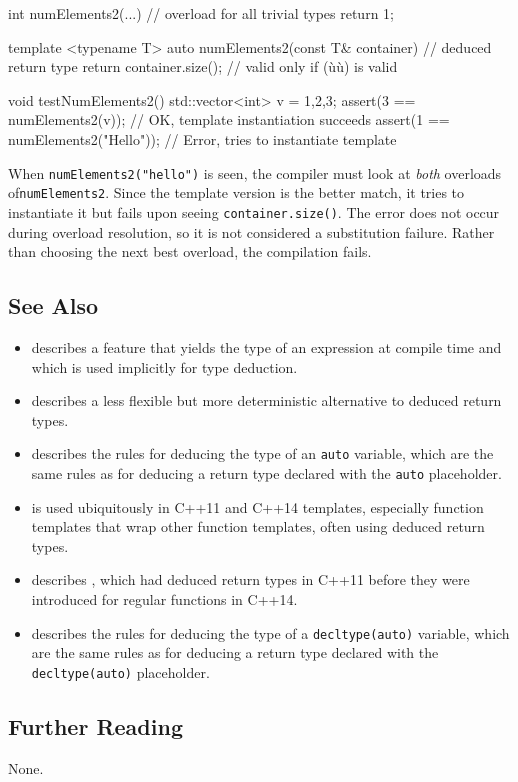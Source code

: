 \begin{emcppslisting}
int numElements2(...)  // overload for all trivial types
{
    return 1;
}

template <typename T>
auto numElements2(const T& container)  // deduced return type
{
    return container.size();  // valid only if (ù{}ù) is valid
}

void testNumElements2()
{
    std::vector<int> v = {1,2,3};
    assert(3 == numElements2(v));        // OK, template instantiation succeeds
    assert(1 == numElements2("Hello"));  // Error, tries to instantiate template
}
\end{emcppslisting}
    

\noindent When \lstinline!numElements2("hello")! is seen, the compiler must look at
\emph{both} overloads of\linebreak[4] \lstinline!numElements2!. Since the template
version is the better match, it tries to instantiate it but fails upon
seeing \lstinline!container.size()!. The error does not occur during
overload resolution, so it is not considered a substitution failure.
Rather than choosing the next best overload, the compilation fails.

\subsection[See Also]{See Also}\label{see-also}

\begin{itemize}
\item{describes a feature that yields the type of an expression at compile time and which is used implicitly for type deduction.}
%
\item{describes a less flexible but more deterministic alternative to deduced return types.}
%
\item{describes the rules for deducing the type of an \lstinline!auto! variable, which are the same rules as for deducing a return type declared with the \lstinline!auto! placeholder.}
%
\item{is used ubiquitously in C++11 and C++14 templates, especially function templates that wrap other function templates, often using deduced return types.}
%
\item{describes , which had deduced return types in C++11 before they were introduced for regular functions in C++14.}
%
\item{describes the rules for deducing the type of a \lstinline!decltype(auto)! variable, which are the same rules as for deducing a return type declared with the \lstinline!decltype(auto)! placeholder.}
\end{itemize}

\subsection[Further Reading]{Further Reading}\label{further-reading}

None.


